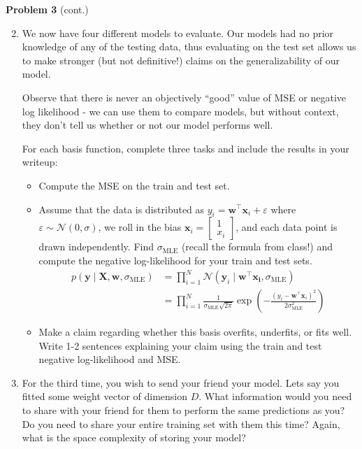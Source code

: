 \documentclass[submit]{harvardml}
\begin{document}
\newpage
\begin{framed}
\noindent\textbf{Problem 3} (cont.)\\
\begin{enumerate}
\setcounter{enumi}{1}
\item 

We now have four different models to evaluate. Our models had no
prior knowledge of any of the testing data, thus evaluating on
the test set allows us to make stronger (but not definitive!) 
claims on the generalizability of our model.

Observe that there is never an objectively ``good'' value of MSE or negative log likelihood - we can use them to compare models, but without context, they don't tell us whether or not our model performs well.

For each basis function, complete three tasks and include the
results in your writeup: 
\begin{itemize}
\item Compute the MSE on the train and test set. 

\item Assume that the data is distributed as 
$y_i = \mathbf{w}^\top \mathbf{x}_i + \varepsilon$ where 
$\varepsilon \sim \mathcal{N}(0, \sigma)$, we roll in the bias 
$\mathbf{x}_i = \begin{bmatrix} 1 \\ x_i \end{bmatrix}$, and each data point
is drawn independently. Find $\sigma_{\text{MLE}}$ (recall the formula from class!) and compute the 
negative log-likelihood for your train and test sets. 
\begin{align*} p(\mathbf{y}\mid \mathbf{X},\mathbf{w},\sigma_{\text{MLE}}) 
&= \prod_{i=1}^N \mathcal{N}(\mathbf{y}_i \mid \mathbf{w}^\top\mathbf{x_i}, \sigma_{\text{MLE}}) \\
&= \prod_{i=1}^N \frac{1}{\sigma_{\text{MLE}}\sqrt{2\pi}}\exp\left(-\frac{(y_i - \mathbf{w}^\top \mathbf{x}_i)^2}{2\sigma_{\text{MLE}}^2}\right)
\end{align*}

\item Make a claim regarding whether this basis overfits, 
underfits, or fits well. Write 1-2 sentences explaining your 
claim using the train and test negative log-likelihood and MSE.

\end{itemize}
\item For the third time, you wish to send your friend your model. Lets say you fitted some weight vector of dimension $D$. What information would you need to share with your friend for them to perform the same predictions as you? Do you need to share your entire training set with them this time? Again, what is the space complexity of storing your model?


\end{enumerate}
\end{framed}
\end{document}
